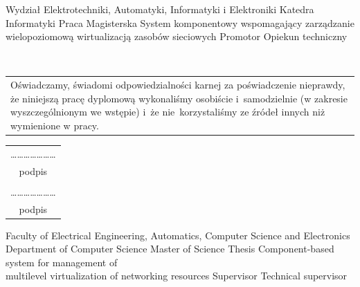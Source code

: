 \documentclass[11pt,openany]{book}
\begin{document}
                  {Wydział Elektrotechniki, Automatyki, Informatyki i Elektroniki}
                  {Katedra Informatyki}
                  {Praca Magisterska}
                  {System komponentowy wspomagający zarządzanie \\ wielopoziomową wirtualizacją zasobów sieciowych}
                  {Promotor}
                  {Opiekun techniczny}

  {\thispagestyle{empty}

    ~

    \vfill

    \hfill
    \begin{tabular*}{.75\textwidth}{p{}}
      Oświadczamy, świadomi odpowiedzialności karnej za \mbox{poświadczenie} nieprawdy, że niniejszą pracę dyplomową
      wykonaliśmy osobiście i~samodzielnie (w zakresie wyszczególnionym we wstępie) i~że \mbox{nie korzystaliśmy} ze
      źródeł innych niż wymienione w pracy.
    \end{tabular*}

    \vspace{2cm}

    \hfill
    \begin{tabular}{c}
      \ldots\ldots\ldots\ldots\ldots\ldots\ldots \\
      podpis                                     \\
                                                 \\
      \ldots\ldots\ldots\ldots\ldots\ldots\ldots \\
      podpis
    \end{tabular}

    \newpage
  }

                  {Faculty of Electrical Engineering, Automatics, Computer Science and Electronics}
                  {Department of Computer Science}
                  {Master of Science Thesis}
                  {Component-based system for management of \\ multilevel virtualization of networking resources}
                  {Supervisor}
                  {Technical supervisor}

  \thispagestyle{empty}
	\vspace*{\fill}
\end{document}
